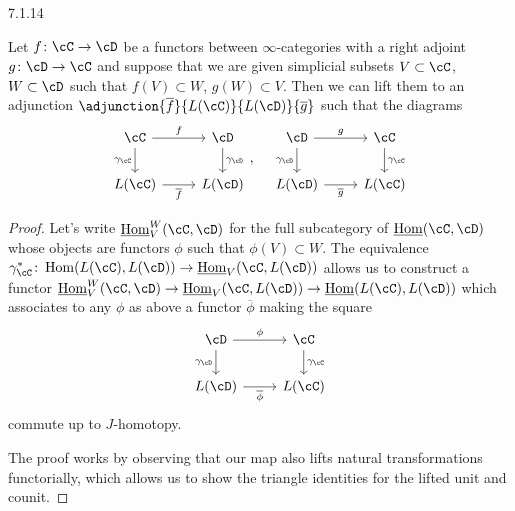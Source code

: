 \documentclass[a4paper,fontsize=12pt]{scrartcl}
\begin{document}
\begin{prop}\label{7114}
  7.1.14

  Let $f\colon\cC\rightarrow\cD$ be a functors between $\infty$-categories with
  a right adjoint $g\colon\cD\rightarrow\cC$ and suppose that we are given
  simplicial subsets $V\subset\cC$, $W\subset\cD$ such that $f(V)\subset W$,
  $g(W)\subset V$. Then we can lift them to an adjunction
  $\adjunction{\overline{f}}{L(\cC)}{L(\cD)}{\overline{g}}$ such that the
  diagrams
  \[\begin{tikzcd}
    \cC & \cD \\
    {L(\cC)} & {L(\cD)}
    \arrow["{\gamma_\cD}", from=1-2, to=2-2]
    \arrow["{\gamma_\cC}"', from=1-1, to=2-1]
    \arrow["{\overline{f}}"', from=2-1, to=2-2]
    \arrow["f", from=1-1, to=1-2]
  \end{tikzcd},
  \quad
  \begin{tikzcd}
    \cD & \cC \\
    {L(\cD)} & {L(\cC)}
    \arrow["{\gamma_\cC}", from=1-2, to=2-2]
    \arrow["{\gamma_\cD}"', from=1-1, to=2-1]
    \arrow["{\overline{g}}"', from=2-1, to=2-2]
    \arrow["g", from=1-1, to=1-2]
  \end{tikzcd}
  \]
\end{prop}
\begin{proof}
  Let's write $\Home_V^W(\cC,\cD)$ for the full subcategory of $\Home(\cC,\cD)$
  whose objects are functors $\phi$ such that $\phi(V)\subset W$. The
  equivalence
  $\gamma^*_\cC\colon\Hom(L(\cC),L(\cD))\rightarrow\Home_V(\cC,L(\cD))$ allows
  us to construct a functor
  $\Home^W_V(\cC,\cD)\rightarrow\Home_V(\cC,L(\cD))\rightarrow\Home(L(\cC),L(\cD))$
  which associates to any $\phi$ as above a functor $\overline{\phi}$ making the
  square
  \[\begin{tikzcd}
    \cD & \cC \\
    {L(\cD)} & {L(\cC)}
    \arrow["{\gamma_\cC}", from=1-2, to=2-2]
    \arrow["{\gamma_\cD}"', from=1-1, to=2-1]
    \arrow["{\overline{\phi}}"', from=2-1, to=2-2]
    \arrow["\phi", from=1-1, to=1-2]
  \end{tikzcd}\]
  commute up to $J$-homotopy.

  The proof works by observing that our map also lifts natural transformations
  functorially, which allows us to show the triangle identities for the lifted
  unit and counit.
\end{proof}
\end{document}
